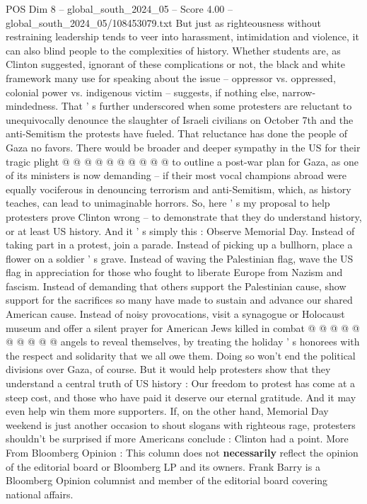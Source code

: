 \begin{textsample}{POS Dim 8 – global\_south\_2024\_05 – Score 4.00 – global\_south\_2024\_05/108453079.txt}
But just as righteousness without restraining leadership tends to veer into harassment, intimidation and violence, it can also blind people to the complexities of history.
Whether students are, as Clinton suggested, ignorant of these complications or not, the black and white framework many use for speaking about the issue -- oppressor vs. oppressed, colonial power vs. indigenous victim -- suggests, if nothing else, narrow-mindedness.
That ' s further underscored when some protesters are reluctant to unequivocally denounce the slaughter of Israeli civilians on October 7th and the anti-Semitism the protests have fueled.
That reluctance has done the people of Gaza no favors.
There would be broader and deeper sympathy in the US for their tragic plight @ @ @ @ @ @ @ @ @ @ to outline a post-war plan for Gaza, as one of its ministers is now demanding -- if their most vocal champions abroad were equally vociferous in denouncing terrorism and anti-Semitism, which, as history teaches, can lead to unimaginable horrors.
So, here ' s my proposal to help protesters prove Clinton wrong -- to demonstrate that they do understand history, or at least US history.
And it ' s simply this : Observe Memorial Day.
Instead of taking part in a protest, join a parade.
Instead of picking up a bullhorn, place a flower on a soldier ' s grave.
Instead of waving the Palestinian flag, wave the US flag in appreciation for those who fought to liberate Europe from Nazism and fascism.
Instead of demanding that others support the Palestinian cause, show support for the sacrifices so many have made to sustain and advance our shared American cause.
Instead of noisy provocations, visit a synagogue or Holocaust museum and offer a silent prayer for American Jews killed in combat @ @ @ @ @ @ @ @ @ @ angels to reveal themselves, by treating the holiday ' s honorees with the respect and solidarity that we all owe them.
Doing so won't end the political divisions over Gaza, of course.
But it would help protesters show that they understand a central truth of US history : Our freedom to protest has come at a steep cost, and those who have paid it deserve our eternal gratitude.
And it may even help win them more supporters.
If, on the other hand, Memorial Day weekend is just another occasion to shout slogans with righteous rage, protesters shouldn't be surprised if more Americans conclude : Clinton had a point.
More From Bloomberg Opinion : This column does not \textbf{necessarily} reflect the opinion of the editorial board or Bloomberg LP and its owners.
Frank Barry is a Bloomberg Opinion columnist and member of the editorial board covering national affairs.

\end{textsample}
